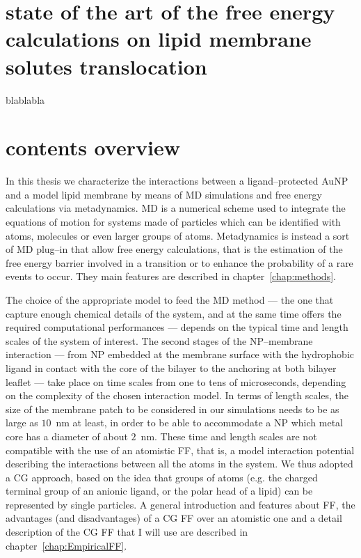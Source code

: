 \section{state of the art of the free energy calculations on lipid membrane solutes translocation}
blablabla


\section{contents overview}
In this thesis we characterize the interactions between a ligand--protected \ac{AuNP} and a model lipid membrane by means of \ac{MD} simulations and free energy calculations via metadynamics. \ac{MD} is a numerical scheme used to integrate the equations of motion for systems made of particles which can be identified with atoms, molecules or even larger groups of atoms. Metadynamics is instead a sort of \ac{MD} plug--in that allow free energy calculations, that is the estimation of the free energy barrier involved in a transition or to enhance the probability of a rare events to occur. They main features are described in chapter~\ref{chap:methods}.

The choice of the appropriate model to feed the \ac{MD} method --- the one that capture enough chemical details of the system, and at the same time offers the required computational performances --- depends on the typical time and length scales of the system of interest. The second stages of the \ac{NP}--membrane interaction --- from \ac{NP} embedded at the membrane surface with the hydrophobic ligand in contact with the core of the bilayer to the anchoring at both bilayer leaflet --- take place on time scales from one to tens of microseconds, depending on the complexity of the chosen interaction model. In terms of length scales, the size of the membrane patch to be considered in our simulations needs to be as large as $10$~nm at least, in order to be able to accommodate a \ac{NP} which metal core has a diameter of about $2$~nm. These time and length scales are not compatible with the use of an atomistic \ac{FF}, that is, a model interaction potential describing the interactions between all the atoms in the system. We thus adopted a \ac{CG} approach, based on the idea that groups of atoms (e.g. the charged terminal group of an anionic ligand, or the polar head of a lipid) can be represented by single particles. A general introduction and features about \ac{FF}, the advantages (and disadvantages) of a \ac{CG} \ac{FF} over an atomistic one and a detail description of the \ac{CG} \ac{FF} that I will use are described in chapter~\ref{chap:EmpiricalFF}.

